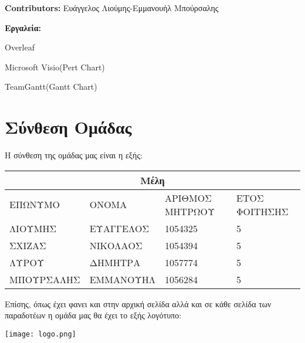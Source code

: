 \documentclass[12pt,a4paper,oneside]{article}
\begin{document}
\textbf{Contributors:}
\newline
Ευάγγελος Λιούμης-Εμμανουήλ Μπούρσαλης


\vspace{8cm}

\raggedright
\textbf{Εργαλεία:}

    Overleaf
    
    Microsoft Visio(Pert Chart)
    
    TeamGantt(Gantt Chart)

\newpage


\tableofcontents
{}

\newpage
\setcounter{page}{1}


\section{Σύνθεση Ομάδας}\label{sec:intro}
\pagestyle{fancy}

Η σύνθεση της ομάδας μας είναι η εξής:
\vspace{0.5cm}

\begin{tabular}{ |p{4cm}|p{4cm}|p{3cm}|p{3cm}|  }
 \hline
 \multicolumn{4}{|c|}{Μέλη} \\
 \hline
 ΕΠΩΝΥΜΟ& ΟΝΟΜΑ &ΑΡΙΘΜΟΣ ΜΗΤΡΩΟΥ&ΕΤΟΣ ΦΟΙΤΗΣΗΣ\\
 \hline
 ΛΙΟΥΜΗΣ   & ΕΥΑΓΓΕΛΟΣ    & 1054325 &  5\\
 ΣΧΙΖΑΣ &  ΝΙΚΟΛΑΟΣ & 1054394  & 5\\
 ΛΥΡΟΥ & ΔΗΜΗΤΡΑ & 1057774 &  5\\
 ΜΠΟΥΡΣΑΛΗΣ   & ΕΜΜΑΝΟΥΗΛ & 1056284 & 5\\
\hline 
\end{tabular}


\vspace{2cm}
Επίσης, όπως έχει φανει και στην αρχική σελίδα αλλά και σε κάθε σελίδα των παραδοτέων η ομάδα μας θα έχει το εξής λογότυπο:
\newline
\vspace{2cm}
\centerline{\texttt{[image: logo.png]}}
 
\newpage
\end{document}
